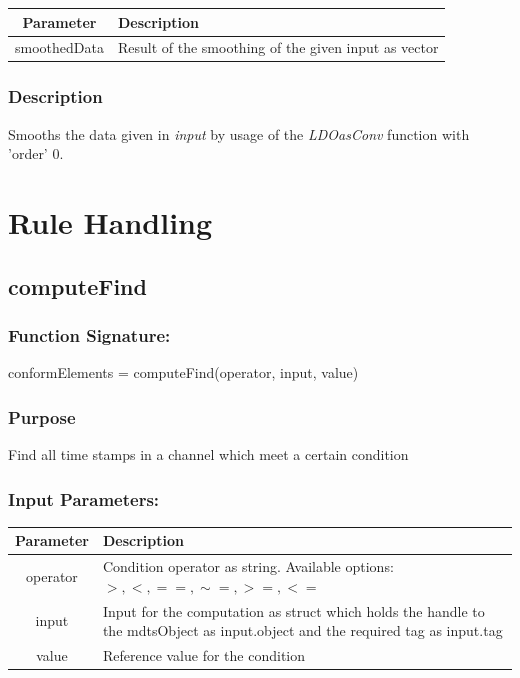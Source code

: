 \documentclass[a4]{scrreprt}
\begin{document}
\begin{longtabu} to \textwidth {|c|X|}
	\hline
	\textbf{Parameter} & \textbf{Description} \\ \hline
	\endhead
	smoothedData & Result of the smoothing of the given input as vector \\ \hline
\end{longtabu}

\subsubsection{Description}

Smooths the data given in \textit{input} by usage of the \textit{LDOasConv} function with 'order' 0.

\section{Rule Handling}

\subsection{computeFind}

\subsubsection{Function Signature:}

\begin{center}
	conformElements = computeFind(operator, input, value)
\end{center}

\subsubsection{Purpose}

Find all time stamps in a channel which meet a certain condition

\subsubsection{Input Parameters:}

\begin{longtabu} to \textwidth {|c|X|}
	\hline
	\textbf{Parameter} & \textbf{Description} \\ \hline
	\endhead
	operator & Condition operator as string. Available options: $>, <, ==, \sim=, >=, <=$ \\ \hline
	input & Input for the computation as struct which holds the handle to the mdtsObject as input.object and the required tag as input.tag \\ \hline
	value & Reference value for the condition \\ \hline
\end{longtabu}
\end{document}
